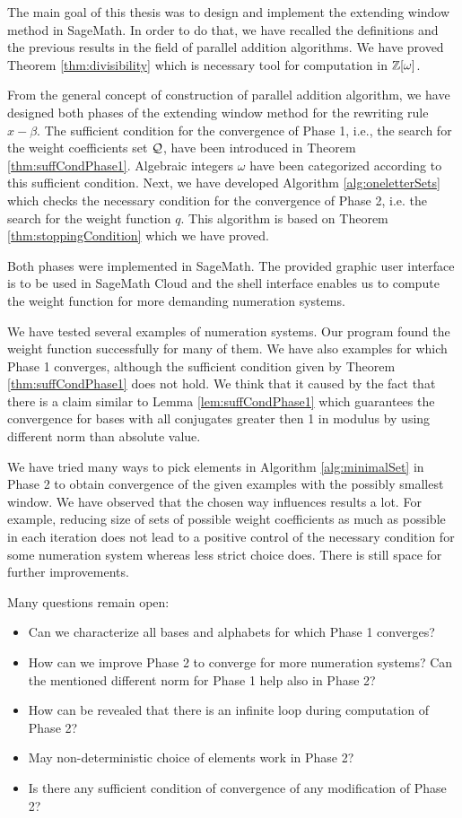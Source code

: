 The main goal of this thesis was to design and implement the extending window method in SageMath. In order to do that, we have recalled the definitions and the previous results in the field of parallel addition algorithms. We have proved Theorem \ref{thm:divisibility} which is necessary tool for computation in $\mathbb{Z}[\omega]$.

From the general concept of construction of parallel addition algorithm, we have designed both phases of the extending window method for the rewriting rule $x-\beta$. The sufficient condition for the convergence of Phase 1, i.e., the search for the weight coefficients set $\mathcal{Q}$, have been introduced in Theorem \ref{thm:suffCondPhase1}. Algebraic integers $\omega$ have been categorized according to this sufficient condition. Next, we have developed Algorithm \ref{alg:oneletterSets} which checks the necessary condition for the convergence of Phase 2, i.e. the search for the weight function $q$. This algorithm is based on Theorem \ref{thm:stoppingCondition} which we have proved.

Both phases were implemented in SageMath. The provided graphic user interface is  to be used in SageMath Cloud and the shell interface enables us to compute the weight function for more demanding numeration systems.

We have tested several examples of numeration systems. Our program found the weight function successfully for many of them. We have also examples for which Phase 1 converges, although the sufficient condition given by Theorem \ref{thm:suffCondPhase1} does not hold. We think that it caused by the fact that there is a claim similar to Lemma \ref{lem:suffCondPhase1} which guarantees the convergence for bases with all conjugates greater then 1 in modulus by using different norm than absolute value.

We have tried many ways to pick elements in Algorithm \ref{alg:minimalSet} in Phase 2 to obtain convergence of the given examples with the possibly smallest window. We have observed that the chosen way influences results a lot. For example, reducing  size of sets of possible weight coefficients as much as possible in each iteration does not lead to a positive control of the necessary condition for some numeration system whereas less strict choice does. There is still space for further improvements.

Many questions remain open:
\begin{itemize}
\item Can we characterize all bases and alphabets for which Phase 1 converges?
\item How can we improve Phase 2 to converge for more numeration systems? Can the mentioned different norm for Phase 1 help also in Phase 2? 
\item How can be revealed that there is an infinite loop during computation of Phase 2?
\item May non-deterministic choice of elements work in Phase 2?
\item Is there any sufficient condition of convergence of any modification of Phase 2? 
\end{itemize}
